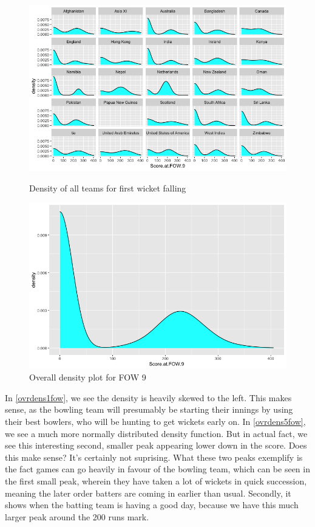 \begin{figure}[h]
    \centering
    \begin{minipage}{0.4\textwidth}
        \centering
        \includegraphics[scale=0.3]{figures/fow9density.png}
        \caption{Density of all teams for first wicket falling}
        \label{alldens9fow}
    \end{minipage}
    \begin{minipage}{0.4\textwidth}
        \centering
        \includegraphics[scale=0.3]{figures/fow9densfull.png}
        \caption{Overall density plot for FOW 9}
        \label{ovrdens9fow}
    \end{minipage}
\end{figure}

In \ref{ovrdens1fow}, we see the density is heavily skewed to the left. This makes sense, as the bowling team will presumably be starting 
their innings by using their best bowlers, who will be hunting to get wickets early on. In \ref{ovrdens5fow}, we see a much more normally distributed
density function. But in actual fact, we see this interesting second, smaller peak appearing lower down in the score. Does this make sense? It's certainly 
not suprising. What these two peaks exemplify is the fact games can go heavily in favour of the bowling team, which can be seen in the first small peak,
wherein they have taken a lot of wickets in quick succession, meaning the later order batters are coming in earlier than usual. Secondly, it shows when the 
batting team is having a good day, because we have this much larger peak around the 200 runs mark.\\


